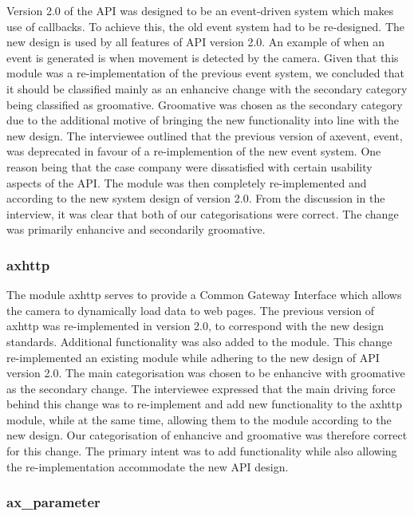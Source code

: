 \documentclass{sig-alternate}
\begin{document}
Version 2.0 of the API was designed to be an event-driven system which makes use of callbacks. To achieve this, the old event system had to be re-designed. The new design is used by all features of API version 2.0. An example of when an event is generated is when movement is detected by the camera. 
Given that this module was a re-implementation of the previous event system, we concluded that it should be classified mainly as an enhancive change with the secondary category being classified as groomative. Groomative was chosen as the secondary category due to the additional motive of bringing the new functionality into line with the new design.
The interviewee outlined that the previous version of axevent, event, was deprecated in favour of a re-implemention of the new event system. One reason being that the case company were dissatisfied with certain usability aspects of the API. The module was then completely re-implemented and according to the new system design of version 2.0.
From the discussion in the interview, it was clear that both of our categorisations were correct. The change was primarily enhancive and secondarily groomative.

\subsubsection{axhttp}

The module axhttp serves to provide a Common Gateway Interface which allows the camera to dynamically load data to web pages. The previous version of axhttp was re-implemented in version 2.0, to correspond with the new design standards. Additional functionality was also added to the module.
This change re-implemented an existing module while adhering to the new design of API version 2.0. The main categorisation was chosen to be enhancive with groomative as the secondary change.
The interviewee expressed that the main driving force behind this change was to re-implement and add new functionality to the axhttp module, while at the same time, allowing them to the module according to the new design.
Our categorisation of enhancive and groomative was therefore correct for this change. The primary intent was to add functionality while also allowing the re-implementation accommodate the new API design. 

\subsubsection{ax\_parameter}
\end{document}
